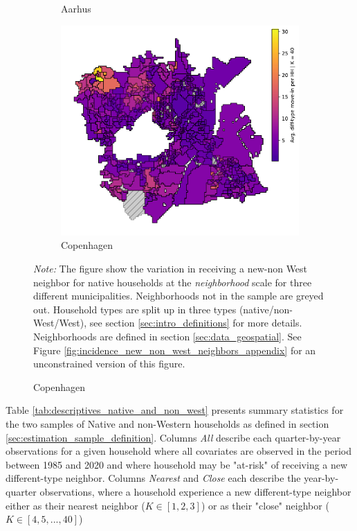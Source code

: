 \documentclass[main.tex]{subfiles}
\begin{document}
\begin{figure}
\begin{subfigure}{.42\textwidth}
	\caption{Aarhus} \label{fig:incidence_different_type_aarhus}
	\end{subfigure}
    
    \begin{subfigure}{.65\textwidth}	
	\centering
	\includegraphics[width=\textwidth]{figs/cph_howdy_neighbor_sample.pdf}	
	\caption{Copenhagen} \label{fig:incidence_different_type_cph}
	\end{subfigure}	
\begin{tablenotes}
\item \footnotesize \textit{Note:} The figure show the variation in receiving a new-non West neighbor for native households at the \textit{neighborhood} scale for three different municipalities. Neighborhoods not in the sample are greyed out. Household types are split up in three types (native/non-West/West), see section \ref{sec:intro_definitions} for more details. Neighborhoods are defined in section \ref{sec:data_geospatial}. See Figure \ref{fig:incidence_new_non_west_neighbors_appendix} for an unconstrained version of this figure.
\end{tablenotes}
\label{fig:incidence_new_non_west_neighbors}
\end{figure}

\newpage
Table \ref{tab:descriptives_native_and_non_west} presents summary statistics for the two samples of Native and non-Western households as defined in section \ref{sec:estimation_sample_definition}. Columns \textit{All} describe each quarter-by-year observations for a given household where all covariates are observed in the period between 1985 and 2020 and where household may be "at-risk" of receiving a new different-type neighbor. Columns \textit{Nearest} and \textit{Close} each describe the year-by-quarter observations, where a household experience a new different-type neighbor either as their nearest neighbor ($K\in [1,2, 3]$) or as their "close" neighbor ($K \in [4,5, ..., 40]$)
\end{document}
